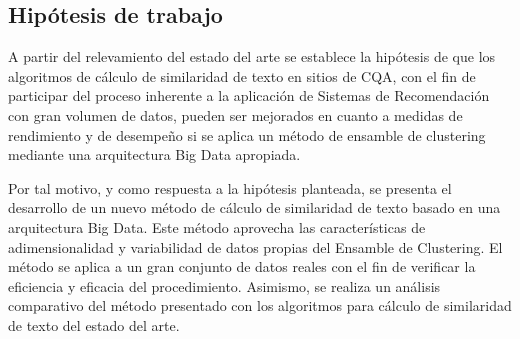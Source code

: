 \subsection{Hipótesis de trabajo}
A partir del relevamiento del estado del arte se establece la hipótesis de que los algoritmos de cálculo de similaridad de texto en sitios de CQA, con el fin de participar del proceso inherente a la aplicación de Sistemas de Recomendación con gran volumen de datos, pueden ser mejorados en cuanto a medidas de rendimiento y de desempeño si se aplica un método de ensamble de clustering mediante una arquitectura Big Data apropiada.

\bigskip Por tal motivo, y como respuesta a la hipótesis planteada, se presenta el desarrollo de un nuevo método de cálculo de similaridad de texto basado en una arquitectura Big Data. Este método aprovecha las características de adimensionalidad y variabilidad de datos propias del Ensamble de Clustering. El método se aplica a un gran conjunto de datos reales con el fin de verificar la eficiencia y eficacia del procedimiento. Asimismo, se realiza un análisis comparativo del método presentado con los algoritmos para cálculo de similaridad de texto del estado del arte.